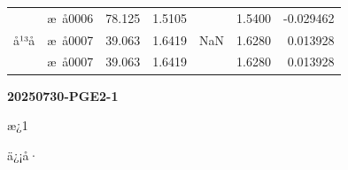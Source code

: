 \documentclass[UTF8,10pt,a4paper,fontset=fandol]{ctexart}
\newcommand{\fieldvalue}[1]{#1}
\begin{document}
\begin{tabularx}{\textwidth}{l l r r r r r}
&
\fieldvalue{æ å0006} &
\fieldvalue{78.125} &
\fieldvalue{1.5105} &
&
\fieldvalue{1.5400} &
\fieldvalue{-0.029462}\\

å¹³å &
\fieldvalue{æ å0007} &
\fieldvalue{39.063} &
\fieldvalue{1.6419} &
\fieldvalue{NaN} &
\fieldvalue{1.6280} &
\fieldvalue{0.013928}\\

&
\fieldvalue{æ å0007} &
\fieldvalue{39.063} &
\fieldvalue{1.6419} &
&
\fieldvalue{1.6280} &
\fieldvalue{0.013928}\\
\end{tabularx}

\normalsize

\newpage

\noindent\textbf{20250730-PGE2-1}\hfill{}

\medskip
\noindent æ¿1

\noindent ä¿¡å·
\end{document}

